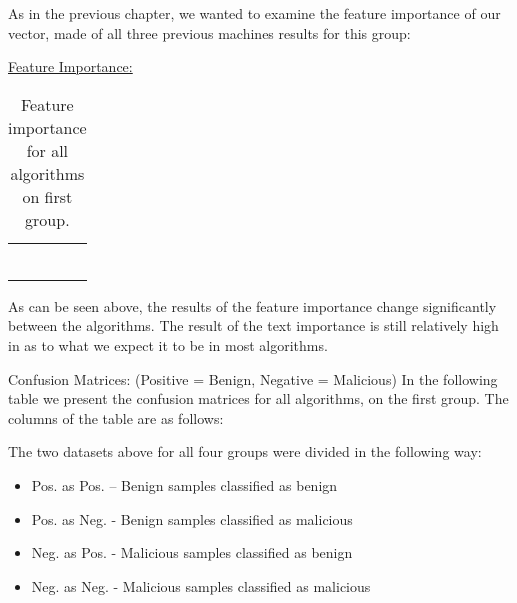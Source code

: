 \documentclass{article}
\begin{document}
\clearpage
\newpage

\indent As in the previous chapter, we wanted to examine the feature importance of our vector, made of all three previous machines results for this group:

\noindent\underline{Feature Importance:}

\begin{table}[htb]
\centering
\begin{tabular}{|M{2.5cm}|M{2.5cm}|M{2.5cm}|M{2.5cm}|}
	\hline
	\centering{} &  &  & \tabularnewline
	\hline
	 &  &  & \tabularnewline
	\hline
	 &  &  & \tabularnewline
	\hline
	 &  &  & \tabularnewline
	\hline
	 &  &  & \tabularnewline
	\hline
	 &  &  & \tabularnewline
	\hline
	 &  &  & \tabularnewline
	\hline
\end{tabular}
\caption{Feature importance for all algorithms on first group.}
\end{table}

\indent As can be seen above, the results of the feature importance change significantly between the algorithms. The result of the text importance is still relatively high in as to what we expect it to be in most algorithms.

\indent Confusion Matrices: (Positive = Benign, Negative = Malicious) 
\indent In the following table we present the confusion matrices for all algorithms, on the first group. The columns of the table are as follows:

\indent The two datasets above for all four groups were divided in the following way:
\renewcommand{\labelitemi}{$\textendash$}
\begin{itemize}
    \item Pos. as Pos. – Benign samples classified as benign
    \item Pos. as Neg. - Benign samples classified as malicious
	\item Neg. as Pos. - Malicious samples classified as benign
	\item Neg. as Neg. - Malicious samples classified as malicious
\end{itemize}
\end{document}
